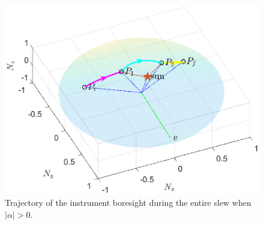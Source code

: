 \documentclass[letterpaper, paper,12pt]{AAS}		%
\begin{document}
	\begin{figure}[!ht]
	\begin{center}
		\includegraphics[width=4.75in]{figures/alphaNot0/phi1_phi2_phi3.eps}
		\caption{Trajectory of the instrument boresight during the entire slew when $|\alpha|>0$.}
		\label{fig:phi1_phi2_phi3}
	\end{center}		
\end{figure}	
\end{document}
